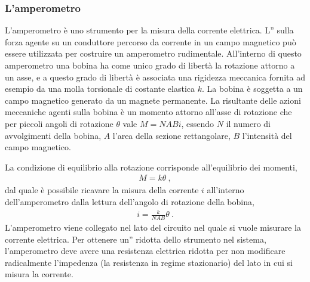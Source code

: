 \documentclass[letterpaper,10pt,italian]{jupyterBook}
\begin{document}
\subsubsection{L’amperometro}
\label{\detokenize{ch/electromagnetism/electromagnetism-steady:l-amperometro}}\label{\detokenize{ch/electromagnetism/electromagnetism-steady:physics-hs-electromagnetism-electromagnetism-steady-experience-faraday-amperometer}}
\sphinxAtStartPar
L’amperometro è uno strumento per la misura della corrente elettrica. L”{\hyperref[\detokenize{ch/electromagnetism/electromagnetism-steady:physics-hs-electromagnetism-electromagnetism-steady-experience-faraday}]{}} sulla forza agente su un conduttore percorso da corrente in un campo magnetico può essere utilizzata per costruire un amperometro rudimentale. All’interno di questo amperometro una bobina ha come unico grado di libertà la rotazione attorno a un asse, e a questo grado di libertà è associata una rigidezza meccanica fornita ad esempio da una molla torsionale di costante elastica \(k\). La bobina è soggetta a un campo magnetico generato da un magnete permanente. La risultante delle azioni meccaniche agenti sulla bobina è un momento attorno all’asse di rotazione che per piccoli angoli di rotazione \(\theta\) vale \(M = N A B i\), essendo \(N\) il numero di avvolgimenti della bobina, \(A\) l’area della sezione rettangolare, \(B\) l’intensità del campo magnetico.

\sphinxAtStartPar
La condizione di equilibrio alla rotazione corrisponde all’equilibrio dei momenti,
\begin{equation*}
\begin{split}M = k \theta \ ,\end{split}
\end{equation*}
\sphinxAtStartPar
dal quale è possibile ricavare la misura della corrente \(i\) all’interno dell’amperometro dalla lettura dell’angolo di rotazione della bobina,
\begin{equation*}
\begin{split}i = \frac{k}{N A B} \theta \ .\end{split}
\end{equation*}
\sphinxAtStartPar
L’amperometro viene collegato  nel lato del circuito nel quale si vuole misurare la corrente elettrica. Per ottenere un”{\hyperref[\detokenize{ch/intro/measurements:physics-hs-intro-measurements-instruments-intrusivity}]{}} ridotta dello strumento nel sistema, l’amperometro deve avere una resistenza elettrica ridotta per non modificare radicalmente l’impedenza (la resistenza in regime stazionario) del lato in cui si misura la corrente.
\end{document}

